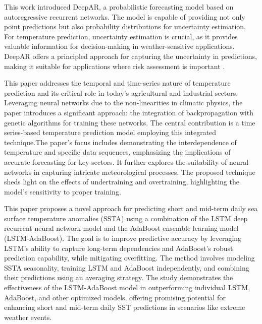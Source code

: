\documentclass[sn-mathphys,Numbered]{sn-jnl}
\theoremstyle{thmstyleone}
\theoremstyle{thmstyletwo}
\theoremstyle{thmstylethree}
\begin{document}
\cite{salinas2020deepar} This work introduced DeepAR, a probabilistic forecasting model based on autoregressive recurrent networks. The model is capable of providing not only point predictions but also probability distributions for uncertainty estimation. For temperature prediction, uncertainty estimation is crucial, as it provides valuable information for decision-making in weather-sensitive applications. DeepAR offers a principled approach for capturing the uncertainty in predictions, making it suitable for applications where risk assessment is important .

\cite{singh2011time} This paper addresses the temporal and time-series nature of temperature prediction and its critical role in today's agricultural and industrial sectors. Leveraging neural networks due to the non-linearities in climatic physics, the paper introduces a significant approach: the integration of backpropagation with genetic algorithms for training these networks. The central contribution is a time series-based temperature prediction model employing this integrated technique.The paper's focus includes demonstrating the interdependence of temperature and specific data sequences, emphasizing the implications of accurate forecasting for key sectors. It further explores the suitability of neural networks in capturing intricate meteorological processes. The proposed technique sheds light on the effects of undertraining and overtraining, highlighting the model's sensitivity to proper training.

  \cite{XIAO2019111358}This paper proposes a novel approach for predicting short and mid-term daily sea surface temperature anomalies (SSTA) using a combination of the LSTM deep recurrent neural network model and the AdaBoost ensemble learning model (LSTM-AdaBoost). The goal is to improve predictive accuracy by leveraging LSTM's ability to capture long-term dependencies and AdaBoost's robust prediction capability, while mitigating overfitting. The method involves modeling SSTA seasonality, training LSTM and AdaBoost independently, and combining their predictions using an averaging strategy. The study demonstrates the effectiveness of the LSTM-AdaBoost model in outperforming individual LSTM, AdaBoost, and other optimized models, offering promising potential for enhancing short and mid-term daily SST predictions in scenarios like extreme weather events.
\end{document}
